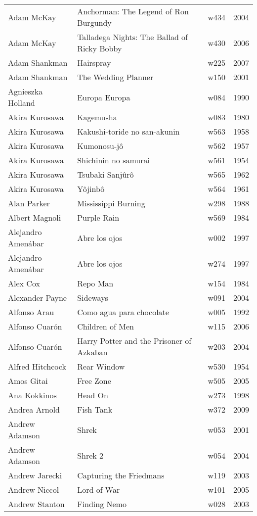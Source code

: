\documentclass{article}
\begin{document}
\begin {center}
\begin{longtable}{l p{10cm} l l}
Adam McKay & Anchorman: The Legend of Ron Burgundy & w434 & 2004 \\
Adam McKay & Talladega Nights: The Ballad of Ricky Bobby & w430 & 2006 \\
Adam Shankman & Hairspray & w225 & 2007 \\
Adam Shankman & The Wedding Planner & w150 & 2001 \\
Agnieszka Holland & Europa Europa & w084 & 1990 \\
Akira Kurosawa & Kagemusha & w083 & 1980 \\
Akira Kurosawa & Kakushi-toride no san-akunin & w563 & 1958 \\
Akira Kurosawa & Kumonosu-jô & w562 & 1957 \\
Akira Kurosawa & Shichinin no samurai & w561 & 1954 \\
Akira Kurosawa & Tsubaki Sanjûrô & w565 & 1962 \\
Akira Kurosawa & Yôjinbô & w564 & 1961 \\
Alan Parker & Mississippi Burning & w298 & 1988 \\
Albert Magnoli & Purple Rain & w569 & 1984 \\
Alejandro Amenábar & Abre los ojos & w002 & 1997 \\
Alejandro Amenábar & Abre los ojos & w274 & 1997 \\
Alex Cox & Repo Man & w154 & 1984 \\
Alexander Payne & Sideways & w091 & 2004 \\
Alfonso Arau & Como agua para chocolate & w005 & 1992 \\
Alfonso Cuarón & Children of Men & w115 & 2006 \\
Alfonso Cuarón & Harry Potter and the Prisoner of Azkaban & w203 & 2004 \\
Alfred Hitchcock & Rear Window & w530 & 1954 \\
Amos Gitai & Free Zone & w505 & 2005 \\
Ana Kokkinos & Head On & w273 & 1998 \\
Andrea Arnold & Fish Tank & w372 & 2009 \\
Andrew Adamson & Shrek & w053 & 2001 \\
Andrew Adamson & Shrek 2 & w054 & 2004 \\
Andrew Jarecki & Capturing the Friedmans & w119 & 2003 \\
Andrew Niccol & Lord of War & w101 & 2005 \\
Andrew Stanton & Finding Nemo & w028 & 2003 \\

\end{longtable}
\end{center}
\end{document}

